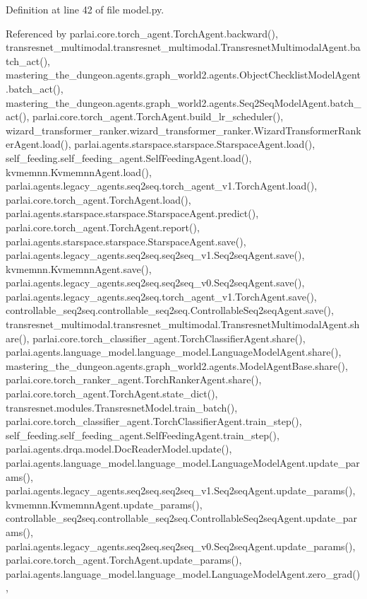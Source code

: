 Definition at line 42 of file model.\+py.



Referenced by parlai.\+core.\+torch\+\_\+agent.\+Torch\+Agent.\+backward(), transresnet\+\_\+multimodal.\+transresnet\+\_\+multimodal.\+Transresnet\+Multimodal\+Agent.\+batch\+\_\+act(), mastering\+\_\+the\+\_\+dungeon.\+agents.\+graph\+\_\+world2.\+agents.\+Object\+Checklist\+Model\+Agent.\+batch\+\_\+act(), mastering\+\_\+the\+\_\+dungeon.\+agents.\+graph\+\_\+world2.\+agents.\+Seq2\+Seq\+Model\+Agent.\+batch\+\_\+act(), parlai.\+core.\+torch\+\_\+agent.\+Torch\+Agent.\+build\+\_\+lr\+\_\+scheduler(), wizard\+\_\+transformer\+\_\+ranker.\+wizard\+\_\+transformer\+\_\+ranker.\+Wizard\+Transformer\+Ranker\+Agent.\+load(), parlai.\+agents.\+starspace.\+starspace.\+Starspace\+Agent.\+load(), self\+\_\+feeding.\+self\+\_\+feeding\+\_\+agent.\+Self\+Feeding\+Agent.\+load(), kvmemnn.\+Kvmemnn\+Agent.\+load(), parlai.\+agents.\+legacy\+\_\+agents.\+seq2seq.\+torch\+\_\+agent\+\_\+v1.\+Torch\+Agent.\+load(), parlai.\+core.\+torch\+\_\+agent.\+Torch\+Agent.\+load(), parlai.\+agents.\+starspace.\+starspace.\+Starspace\+Agent.\+predict(), parlai.\+core.\+torch\+\_\+agent.\+Torch\+Agent.\+report(), parlai.\+agents.\+starspace.\+starspace.\+Starspace\+Agent.\+save(), parlai.\+agents.\+legacy\+\_\+agents.\+seq2seq.\+seq2seq\+\_\+v1.\+Seq2seq\+Agent.\+save(), kvmemnn.\+Kvmemnn\+Agent.\+save(), parlai.\+agents.\+legacy\+\_\+agents.\+seq2seq.\+seq2seq\+\_\+v0.\+Seq2seq\+Agent.\+save(), parlai.\+agents.\+legacy\+\_\+agents.\+seq2seq.\+torch\+\_\+agent\+\_\+v1.\+Torch\+Agent.\+save(), controllable\+\_\+seq2seq.\+controllable\+\_\+seq2seq.\+Controllable\+Seq2seq\+Agent.\+save(), transresnet\+\_\+multimodal.\+transresnet\+\_\+multimodal.\+Transresnet\+Multimodal\+Agent.\+share(), parlai.\+core.\+torch\+\_\+classifier\+\_\+agent.\+Torch\+Classifier\+Agent.\+share(), parlai.\+agents.\+language\+\_\+model.\+language\+\_\+model.\+Language\+Model\+Agent.\+share(), mastering\+\_\+the\+\_\+dungeon.\+agents.\+graph\+\_\+world2.\+agents.\+Model\+Agent\+Base.\+share(), parlai.\+core.\+torch\+\_\+ranker\+\_\+agent.\+Torch\+Ranker\+Agent.\+share(), parlai.\+core.\+torch\+\_\+agent.\+Torch\+Agent.\+state\+\_\+dict(), transresnet.\+modules.\+Transresnet\+Model.\+train\+\_\+batch(), parlai.\+core.\+torch\+\_\+classifier\+\_\+agent.\+Torch\+Classifier\+Agent.\+train\+\_\+step(), self\+\_\+feeding.\+self\+\_\+feeding\+\_\+agent.\+Self\+Feeding\+Agent.\+train\+\_\+step(), parlai.\+agents.\+drqa.\+model.\+Doc\+Reader\+Model.\+update(), parlai.\+agents.\+language\+\_\+model.\+language\+\_\+model.\+Language\+Model\+Agent.\+update\+\_\+params(), parlai.\+agents.\+legacy\+\_\+agents.\+seq2seq.\+seq2seq\+\_\+v1.\+Seq2seq\+Agent.\+update\+\_\+params(), kvmemnn.\+Kvmemnn\+Agent.\+update\+\_\+params(), controllable\+\_\+seq2seq.\+controllable\+\_\+seq2seq.\+Controllable\+Seq2seq\+Agent.\+update\+\_\+params(), parlai.\+agents.\+legacy\+\_\+agents.\+seq2seq.\+seq2seq\+\_\+v0.\+Seq2seq\+Agent.\+update\+\_\+params(), parlai.\+core.\+torch\+\_\+agent.\+Torch\+Agent.\+update\+\_\+params(), parlai.\+agents.\+language\+\_\+model.\+language\+\_\+model.\+Language\+Model\+Agent.\+zero\+\_\+grad(), 